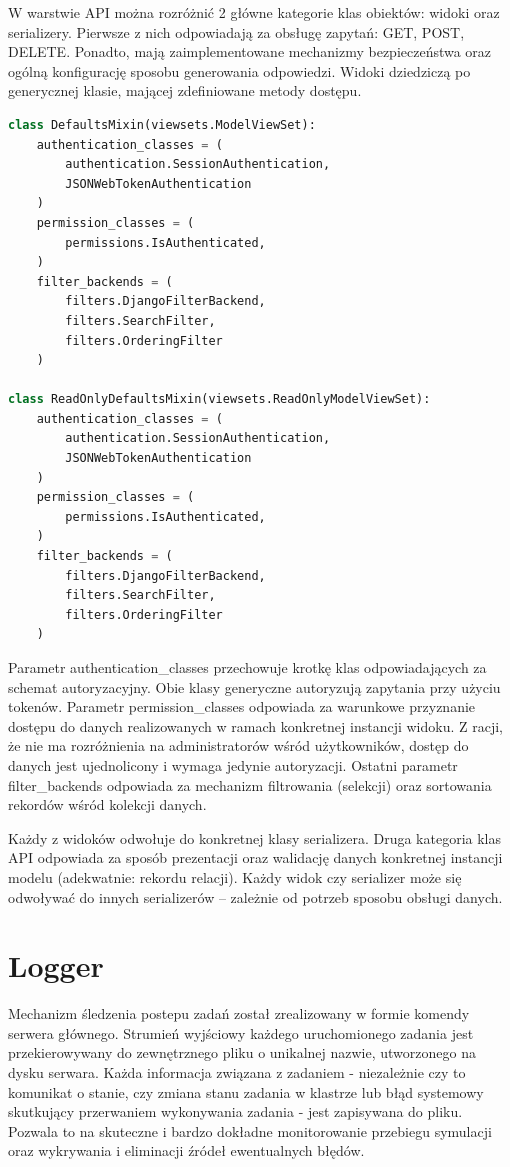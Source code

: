 \documentclass[a4paper,onecolumn,oneside,12pt]{memoir}
\begin{document}
{W warstwie API można rozróżnić 2 główne kategorie klas obiektów: widoki oraz serializery.
Pierwsze z nich odpowiadają za obsługę zapytań: GET, POST, DELETE. Ponadto, mają zaimplementowane
mechanizmy bezpieczeństwa oraz ogólną konfigurację sposobu generowania odpowiedzi.
Widoki dziedziczą po generycznej klasie, mającej zdefiniowane metody dostępu.

\begin{lstlisting}[language=Python, caption=Generyczne klasy widoków API]
class DefaultsMixin(viewsets.ModelViewSet):
    authentication_classes = (
        authentication.SessionAuthentication,
        JSONWebTokenAuthentication
    )
    permission_classes = (
        permissions.IsAuthenticated,
    )
    filter_backends = (
		filters.DjangoFilterBackend,
		filters.SearchFilter,
		filters.OrderingFilter
	)

class ReadOnlyDefaultsMixin(viewsets.ReadOnlyModelViewSet):
    authentication_classes = (
        authentication.SessionAuthentication,
        JSONWebTokenAuthentication
    )
    permission_classes = (
        permissions.IsAuthenticated,
    )
    filter_backends = (
		filters.DjangoFilterBackend,
		filters.SearchFilter,
		filters.OrderingFilter
	)
\end{lstlisting}

Parametr authentication\_classes przechowuje krotkę klas odpowiadających za schemat autoryzacyjny.
Obie klasy generyczne autoryzują zapytania przy użyciu tokenów. Parametr permission\_classes
odpowiada za warunkowe przyznanie dostępu do danych realizowanych w ramach konkretnej
instancji widoku. Z racji, że nie ma rozróżnienia na administratorów wśród użytkowników,
dostęp do danych jest ujednolicony i wymaga jedynie autoryzacji. Ostatni parametr
filter\_backends odpowiada za mechanizm filtrowania (selekcji) oraz sortowania rekordów
wśród kolekcji danych.

Każdy z widoków odwołuje do konkretnej klasy serializera. Druga kategoria klas API
odpowiada za sposób prezentacji oraz walidację danych konkretnej instancji modelu
(adekwatnie: rekordu relacji). Każdy widok czy serializer może się odwoływać do
innych serializerów – zależnie od potrzeb sposobu obsługi danych.

\section{Logger}
\quad \quad Mechanizm śledzenia postepu zadań został zrealizowany w formie komendy
serwera głównego. Strumień wyjściowy każdego uruchomionego zadania jest przekierowywany
do zewnętrznego pliku o unikalnej nazwie, utworzonego na dysku serwara. Każda informacja
związana z zadaniem - niezależnie czy to komunikat o stanie, czy zmiana stanu zadania
w klastrze lub błąd systemowy skutkujący przerwaniem wykonywania zadania - jest zapisywana
do pliku. Pozwala to na skuteczne i bardzo dokładne monitorowanie przebiegu symulacji
oraz wykrywania i eliminacji źródeł ewentualnych błędów.

}
\end{document}
